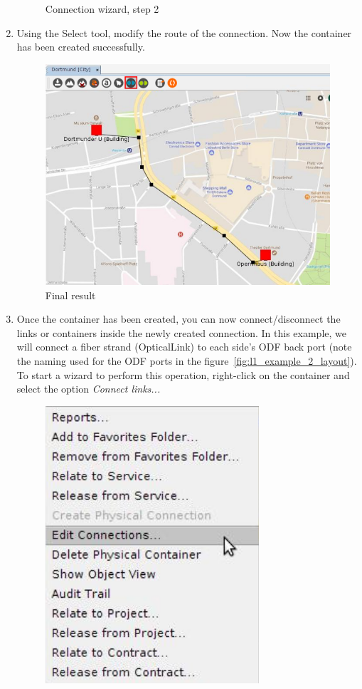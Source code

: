 \documentclass[a4paper]{article}
\begin{document}
\begin{enumerate}
\begin{figure}[h!]
						\caption{Connection wizard, step 2}
						\label{fig:l1_example_2_endpoints}
					\end{figure}			
					\item Using the Select tool, modify the route of the connection. Now the container has been created successfully.
					\begin{figure}[h!]
						\centering
						\includegraphics[width=\linewidth]{img/l1_example_2_final.png}
						\caption{Final result}
						\label{fig:l1_example_2_final}
					\end{figure}
					\item Once the container has been created, you can now connect/disconnect the links or containers inside the newly created connection. In this example, we will connect a fiber strand (OpticalLink) to each side's ODF back port (note the naming used for the ODF ports in the figure~\ref{fig:l1_example_2_layout}). To start a wizard to perform this operation, right-click on the container and select the option \textit{Connect links...}
					\begin{figure}[h!]
						\centering
						\includegraphics[width=0.3\linewidth]{img/l1_example_2_container_context_menu.png}

\end{figure}
\end{enumerate}
\end{document}
